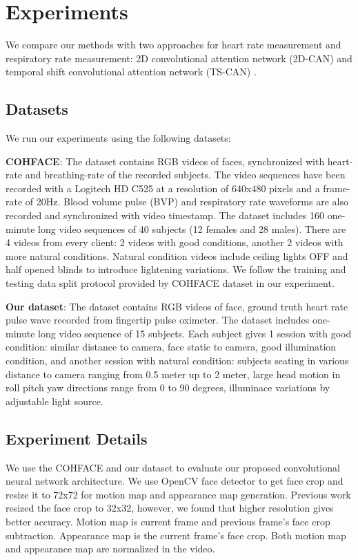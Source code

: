 \documentclass[conference]{IEEEtran}
\begin{document}
\section{Experiments}
\label{sec:experiments}
We  compare  our  methods  with  two  approaches  for  heart rate  measurement and respiratory rate measurement: 2D convolutional attention network (2D-CAN)\cite{chen2018deepphys} and temporal shift convolutional attention network (TS-CAN) \cite{liu2020multi}. 

\subsection{Datasets}

We run our experiments using the following datasets:

\textbf{COHFACE}\cite{heusch2017reproducible}: The dataset contains RGB videos of faces, synchronized with heart-rate and breathing-rate of the recorded subjects. The video sequences have been recorded with a Logitech HD C525 at a resolution of 640x480 pixels and a frame-rate of 20Hz. Blood volume pulse (BVP) and respiratory rate waveforms are also recorded and synchronized with video timestamp. The dataset includes 160 one-minute long video sequences of 40 subjects (12 females and 28 males). There are 4 videos from every client: 2 videos with good conditions, another 2 videos with more natural conditions. Natural condition videos include ceiling lights OFF and half opened blinds to introduce lightening variations. We follow the training and testing data split protocol provided by COHFACE dataset in our experiment.

\textbf{Our dataset}: The dataset contains RGB videos of face, ground truth heart rate pulse wave recorded from fingertip pulse oximeter. The dataset includes one-minute long video sequence of 15 subjects. Each subject gives 1 session with good condition: similar distance to camera, face static to camera, good illumination condition, and another session with natural condition: subjects seating in various distance to camera ranging from 0.5 meter up to 2 meter, large head motion in roll pitch yaw directions range from 0 to 90 degrees, illuminace variations by adjustable light source.

\subsection{Experiment Details}
We use the COHFACE\cite{heusch2017reproducible} and our dataset to evaluate our proposed convolutional neural network architecture. We use OpenCV face detector to get face crop and resize it to 72x72 for motion map and appearance map generation. Previous work \cite{chen2018deepphys, liu2020multi} resized the face crop to 32x32, however, we found that higher resolution gives better accuracy. Motion map is current frame and previous frame's face crop subtraction. Appearance map is the current frame's face crop. Both motion map and appearance map are normalized in the video.   
\end{document}
